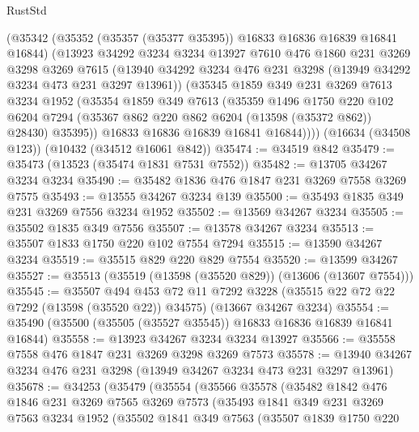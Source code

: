 \begin{lexlean}{RustStd}
\begin{coremodule}
      (@35342
        (@35352 (@35357 (@35377 @35395)) @16833 @16836 @16839 @16841 @16844)
        (@13923
          @34292
          @3234
          @3234
          @13927
          @7610
          @476
          @1860
          @231
          @3269
          @3298
          @3269
          @7615
          (@13940 @34292 @3234 @476 @231 @3298 (@13949 @34292 @3234 @473 @231 @3297 @13961))
          (@35345
            @1859
            @349
            @231
            @3269
            @7613
            @3234
            @1952
            (@35354
              @1859
              @349
              @7613
              (@35359
                @1496
                @1750
                @220
                @102
                @6204
                @7294
                (@35367 @862 @220 @862 @6204 (@13598 (@35372 @862)) @28430)
                @35395))
            @16833
            @16836
            @16839
            @16841
            @16844))))
    (@16634 (@34508 @123))
    (@10432 (@34512 @16061 @842))
@35474 := @34519 @842
@35479 := @35473 (@13523 (@35474 @1831 @7531 @7552))
@35482 := @13705 @34267 @3234 @3234
@35490 := @35482 @1836 @476 @1847 @231 @3269 @7558 @3269 @7575
@35493 := @13555 @34267 @3234 @139
@35500 := @35493 @1835 @349 @231 @3269 @7556 @3234 @1952
@35502 := @13569 @34267 @3234
@35505 := @35502 @1835 @349 @7556
@35507 := @13578 @34267 @3234
@35513 := @35507 @1833 @1750 @220 @102 @7554 @7294
@35515 := @13590 @34267 @3234
@35519 := @35515 @829 @220 @829 @7554
@35520 := @13599 @34267
@35527 := @35513 (@35519 (@13598 (@35520 @829)) (@13606 (@13607 @7554)))
@35545 := @35507
    @494
    @453
    @72
    @11
    @7292
    @3228
    (@35515 @22 @72 @22 @7292 (@13598 (@35520 @22)) @34575)
    (@13667 @34267 @3234)
@35554 := @35490 (@35500 (@35505 (@35527 @35545)) @16833 @16836 @16839 @16841 @16844)
@35558 := @13923 @34267 @3234 @3234 @13927
@35566 := @35558 @7558 @476 @1847 @231 @3269 @3298 @3269 @7573
@35578 := @13940 @34267 @3234 @476 @231 @3298 (@13949 @34267 @3234 @473 @231 @3297 @13961)
@35678 := @34253
    (@35479
      (@35554
        (@35566
          @35578
          (@35482
            @1842
            @476
            @1846
            @231
            @3269
            @7565
            @3269
            @7573
            (@35493
              @1841
              @349
              @231
              @3269
              @7563
              @3234
              @1952
              (@35502
                @1841
                @349
                @7563
                (@35507
                  @1839
                  @1750
                  @220

\end{coremodule}
\end{lexlean}

